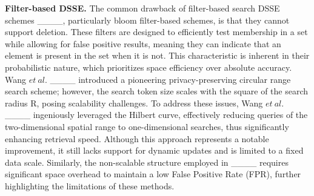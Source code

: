 \par \textbf{Filter-based DSSE.} 
The common drawback of filter-based search DSSE schemes ____, particularly bloom filter-based schemes, is that they cannot support deletion. These filters are designed to efficiently test membership in a set while allowing for false positive results, meaning they can indicate that an element is present in the set when it is not. This characteristic is inherent in their probabilistic nature, which prioritizes space efficiency over absolute accuracy. Wang $et\ al.$ ____ introduced a pioneering privacy-preserving circular range search scheme; however, the search token size scales with the square of the search radius R, posing scalability challenges. To address these issues, Wang $et\ al.$ ____ ingeniously leveraged the Hilbert curve, effectively reducing queries of the two-dimensional spatial range to one-dimensional searches, thus significantly enhancing retrieval speed. Although this approach represents a notable improvement, it still lacks support for dynamic updates and is limited to a fixed data scale. Similarly, the non-scalable structure employed in ____ requires significant space overhead to maintain a low False Positive Rate (FPR), further highlighting the limitations of these methods.
 

